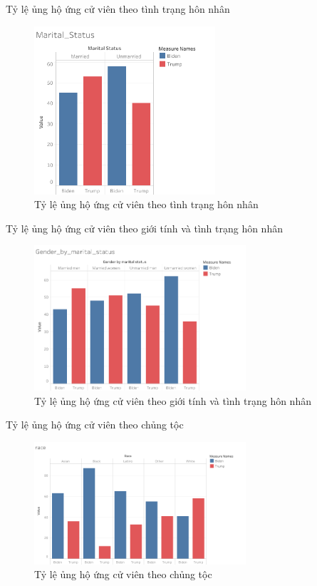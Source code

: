 \documentclass[10pt]{beamer}
\theoremstyle{remark}
\theoremstyle{definition}
\begin{document}
\begin{frame}{Tỷ lệ ủng hộ ứng cử viên theo tình trạng hôn nhân}
	\begin{figure}[h!]
        \centering
        \includegraphics[width=0.6\textwidth]{figures/Marital_Status.png}
        \caption{Tỷ lệ ủng hộ ứng cử viên theo tình trạng hôn nhân}
    \end{figure}
\end{frame}


\begin{frame}{Tỷ lệ ủng hộ ứng cử viên theo giới tính và tình trạng hôn nhân}
	\begin{figure}[h!]
        \centering
        \includegraphics[width=0.7\textwidth]{figures/Gender_by_marital_status.png}
        \caption{Tỷ lệ ủng hộ ứng cử viên theo giới tính và tình trạng hôn nhân}
    \end{figure}
\end{frame}

\begin{frame}{Tỷ lệ ủng hộ ứng cử viên theo chủng tộc}
	\begin{figure}[h!]
        \centering
        \includegraphics[width=0.7\textwidth]{figures/race.png}
        \caption{Tỷ lệ ủng hộ ứng cử viên theo chủng tộc}
    \end{figure}
\end{frame}
\end{document}
